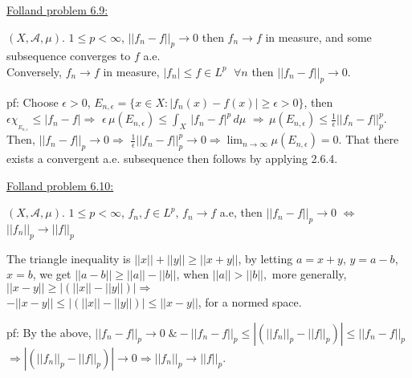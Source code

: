 \documentclass[12pt]{article}
\newcommand{\eps}[0] {  \epsilon }
\newcommand{\rimply}[0] { \Rightarrow }
\newcommand{\rlimply}[0] { \Leftrightarrow }
\begin{document}
\begin{flushleft}
\underline{Folland problem 6.9:}
\end{flushleft}

\begin{flushleft}
$(X,\mathcal A, \mu )$. $1 \le p < \infty$, $||f_n - f||_p \rightarrow 0$ then $f_n \rightarrow f$ in measure, and some subsequence converges to $f$ a.e.\\
Conversely, $f_n \rightarrow f$ in measure, $|f_n| \le f \in L^p$ $\; \forall n$ then $||f_n - f||_p \rightarrow 0$.
\end{flushleft}

\begin{flushleft}
pf: Choose $\eps > 0$, $E_{n,\eps} = \{ x \in X : |f_n(x) - f(x)| \ge \eps > 0 \}$, then $\eps \chi_{_{E_{n,\eps}}} \le |f_n - f| \rimply$ $\eps \, \mu (E_{n,\eps}) \le \int_X \, |f_n - f|^p \, d\mu$ $ \rimply \, \mu (E_{n,\eps}) \le \frac{1}{\eps} ||f_n - f||_p^p $. Then, 
$||f_n - f||_p \rightarrow 0 \rimply$ $\frac{1}{\eps} ||f_n - f||^p_p \rightarrow 0 \rimply \lim_{n \rightarrow \infty} \mu (E_{n,\eps}) = 0$. That there exists a convergent a.e. subsequence then follows by applying 2.6.4.\\

\end{flushleft}


\begin{flushleft}
\underline{Folland problem 6.10:}
\end{flushleft}

\begin{flushleft}
$(X,\mathcal A, \mu )$. $1 \le p < \infty$, $f_n,f \in L^p$, $f_n \rightarrow f$ a.e, then  $||f_n - f||_p \rightarrow 0 $ $\rlimply$ $||f_n ||_p \rightarrow ||f||_p$
\end{flushleft}

\begin{flushleft}
The triangle inequality is $||x|| + ||y|| \ge ||x + y||$, by letting $a = x+y$, $y = a-b$, $x = b$, we get $||a-b|| \ge ||a|| - ||b||$, when $||a|| > ||b||,$ more generally, $||x - y|| \ge | (||x|| - ||y||) | \rimply $ \\ 
  $-||x - y|| \le | (||x|| - ||y||)| \le  ||x - y||  $, for a normed space. \\
\end{flushleft}

\begin{flushleft}
pf: By the above, $||f_n - f||_p \rightarrow 0 \; \& -||f_n - f||_p \le | (||f_n||_p - ||f||_p)| \le  ||f_n - f||_p $ $\rimply | (||f_n||_p - ||f||_p)| \rightarrow 0 \rimply ||f_n||_p \rightarrow ||f||_p$. \\

\end{flushleft}
\end{document}
